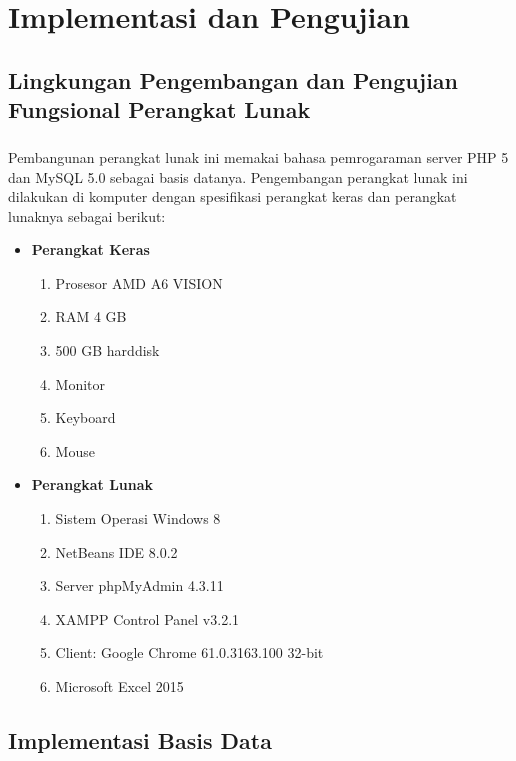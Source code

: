 \chapter{Implementasi dan Pengujian}
\label{chap:implementasiDanPengujian}
\setcounter{secnumdepth}{3}

\section{Lingkungan Pengembangan dan Pengujian Fungsional Perangkat Lunak}
\paragraph{} Pembangunan perangkat lunak ini memakai bahasa pemrogaraman server PHP 5 dan MySQL 5.0 sebagai basis datanya. Pengembangan perangkat lunak ini dilakukan di komputer dengan spesifikasi perangkat keras dan perangkat lunaknya sebagai berikut:
\begin{itemize}
\item \textbf{Perangkat Keras}
\begin{enumerate}
	\item Prosesor AMD A6 VISION
	\item RAM 4 GB
	\item 500 GB harddisk
	\item Monitor
	\item Keyboard
	\item Mouse
\end{enumerate}
\item \textbf{Perangkat Lunak}
\begin{enumerate}
	\item Sistem Operasi Windows 8
	\item NetBeans IDE 8.0.2
	\item Server phpMyAdmin 4.3.11
	\item XAMPP Control Panel v3.2.1
	\item Client: Google Chrome 61.0.3163.100 32-bit
	\item Microsoft Excel 2015
\end{enumerate}

\end{itemize}
\section{Implementasi Basis Data}
